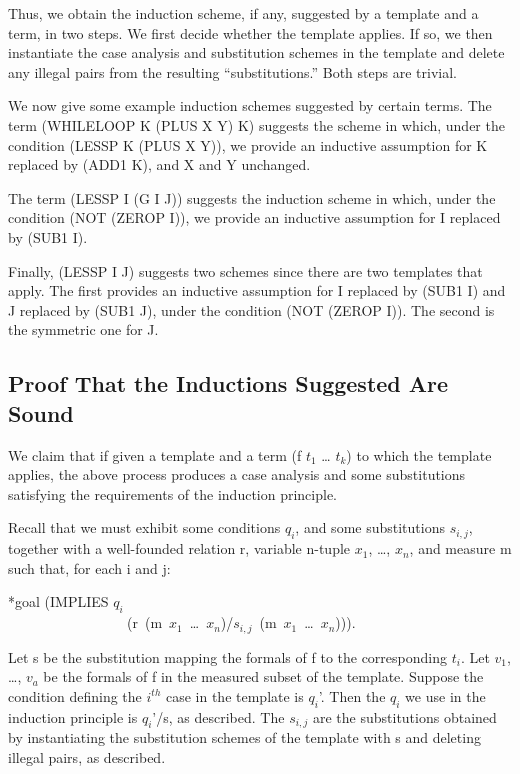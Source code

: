 \documentclass[10pt]{book}
\newenvironment{pubasis}{\begin{flushleft}}{\end{flushleft}}
\begin{document}
Thus, we obtain the induction scheme, if any, suggested by a template and
a term, in two steps.  We first decide whether the template applies.
If so, we then instantiate the case analysis and substitution schemes in the template
and delete any illegal pairs from the resulting ``substitutions.''
Both steps are trivial.

We now give some example induction schemes suggested by certain terms.
The term (WHILELOOP K (PLUS X Y) K) suggests the scheme in which, under
the condition (LESSP K (PLUS X Y)), we provide an inductive assumption
for K replaced by (ADD1 K), and X and Y unchanged.

The term (LESSP I (G I J)) suggests the induction scheme in which, under the
condition (NOT (ZEROP I)), we provide an inductive assumption for I replaced
by (SUB1 I).

Finally, (LESSP I J) suggests two schemes since there are two templates that
apply.  The first provides an inductive assumption for I replaced by (SUB1 I)
and J replaced by (SUB1 J), under the condition (NOT (ZEROP I)).  The
second is the symmetric one for J.

\subsection{Proof That the Inductions Suggested Are Sound}
We claim that if given a template and a term (f $t_{1}$ \ldots{} $t_{k}$) to
which the template applies, the above process produces a case analysis
and some substitutions satisfying the requirements of the induction
principle.

Recall that we must exhibit some conditions $q_{i}$, and some substitutions $s_{i,j}$,
together with a well-founded relation r, variable n-tuple $x_{1}$, \ldots{}, $x_{n}$, and
measure m such that, for each i and j:
\begin{pubasis}
*goal	(IMPLIES $q_{i}$\\
~~~~~~~~~~~~~~~~~(r~(m~$x_{1}$~\ldots{}~$x_{n}$)/$s_{i,j}$~(m~$x_{1}$~\ldots{}~$x_{n}$))).\\
\end{pubasis}
Let s be the substitution mapping the formals of f to the corresponding
$t_{i}$.  Let $v_{1}$, \ldots{}, $v_{a}$ be the formals of f in the measured
subset of the template.  Suppose the condition defining the $i^{th}$ case
in the template is $q_{i}$'.  Then the $q_{i}$ we use in the induction
principle is $q_{i}$'/s, as described.  The $s_{i,j}$ are the substitutions
obtained by instantiating the substitution schemes of the template with
s and deleting illegal pairs, as described.
\end{document}

